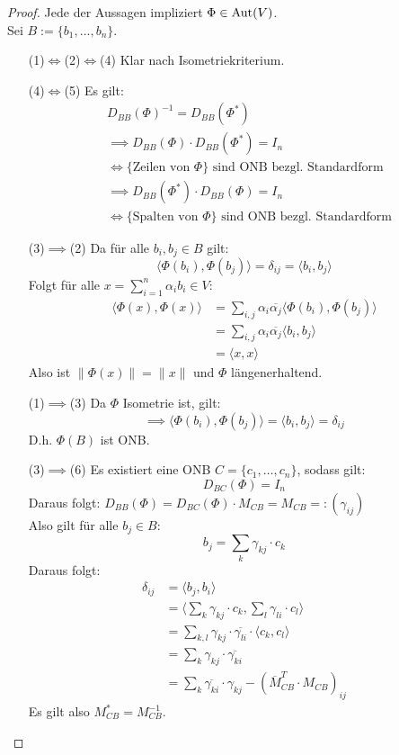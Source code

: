 \documentclass[parskip,a4paper,twoside,DIV15,BCOR12mm]{scrbook}
\begin{document}
\begin{proof}
Jede der Aussagen impliziert $\Phi\in\operatorname{Aut}(V)$.\\
Sei $B:=\{b_1,\ldots,b_n\}$.
\begin{enumerate}
\item[(1)$\iff$(2)$\iff$(4)] Klar nach Isometriekriterium.
\item[(4)$\iff$(5)]Es gilt:
\begin{align*}
&D_{BB}(\Phi)^{-1} = D_{BB}(\Phi^*)\\
&	\implies D_{BB}(\Phi)\cdot D_{BB}(\Phi^*) = I_n\\
&\iff\{\text{Zeilen von }\Phi\}\text{ sind ONB bezgl. Standardform}\\
&\implies D_{BB}(\Phi^*)\cdot D_{BB}(\Phi) = I_n\\
&\iff\{\text{Spalten von }\Phi\}\text{ sind ONB bezgl. Standardform}
\end{align*}
\item[(3)$\implies$(2)]Da für alle $b_i,b_j\in B$ gilt:
\[\langle\Phi(b_i),\Phi(b_j)\rangle =\delta_{ij}=\langle b_i,b_j\rangle\]
Folgt für alle $x=\sum_{i=1}^n{\alpha_i b_i}\in V:$
\begin{align*}
\langle\Phi(x),\Phi(x)\rangle
&=\sum_{i,j}{\alpha_i\overline{\alpha_j}\langle\Phi(b_i),\Phi(b_j)\rangle}\\
&=\sum_{i,j}{\alpha_i\overline{\alpha_j}\langle b_i,b_j\rangle}\\
&=\langle x,x\rangle
\end{align*}
Also ist $\|\Phi(x)\|=\|x\|$ und $\Phi$ längenerhaltend.
\item[(1)$\implies$(3)] Da $\Phi$ Isometrie ist, gilt:
\[\implies \langle\Phi(b_i),\Phi(b_j)\rangle=\langle b_i,b_j\rangle =\delta_{ij}\]
D.h. $\Phi(B)$ ist ONB.
\item[(3)$\implies$(6)] Es existiert eine ONB $C=\{c_1,\ldots,c_n\}$, sodass gilt:
\[D_{BC}(\Phi) = I_n\]
Daraus folgt: $D_{BB}(\Phi)=D_{BC}(\Phi)\cdot M_{CB}=M_{CB}=:(\gamma_{ij})$\\
Also gilt für alle $b_j\in B$:
\[b_j=\sum_k{\gamma_{kj}\cdot c_k}\]
Daraus folgt:
\begin{align*}
\delta_{ij}&=\langle b_j,b_i\rangle\\
&=\langle\sum_k{\gamma_{kj}\cdot c_k},\sum_l{\gamma_{li}\cdot c_l}\rangle\\
&=\sum_{k,l}{\gamma_{kj}\cdot\overline{\gamma_{li}}\cdot\langle c_k,c_l\rangle}\\
&=\sum_k{\gamma_{kj}\cdot\overline{\gamma_{ki}}}\\
&=\sum_k{\overline{\gamma_{ki}}\cdot\gamma_{kj}}-(\overline{M}_{CB}^T\cdot M_{CB})_{ij}
\end{align*}
Es gilt also $M_{CB}^* = M_{CB}^{-1}$.
\end{enumerate}
\end{proof}
\end{document}
